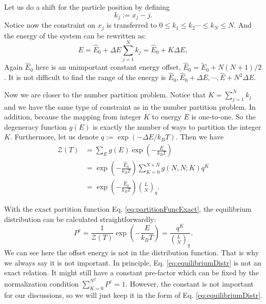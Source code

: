 Let us do a shift for the particle position by defining
\begin{equation}
    k_j := x_j - j.
\end{equation}
Notice now the constraint on $x_j$ is transferred to $0 \leqslant k_1 \leqslant k_2 \cdots \leqslant k_N \leqslant N$. And the energy of the system can be rewritten as:
\begin{equation}
    E = \hat{E}_0 + \Delta E \sum_{j=1}^N k_j = \hat{E}_0 + K \Delta E,
\end{equation}
Again $\hat{E}_0$ here is an unimportant constant energy offset, $\hat{E}_0 = \tilde{E}_0+N(N+1)/2$. 
It is not difficult to find the range of the energy is $\hat{E}_0, \hat{E}_0 + \Delta E, \cdots, \hat{E}+N^2\Delta E$. 

Now we are closer to the number partition problem. Notice that $K=\sum_{j=1}^{N}k_j$ and we have the same type of constraint as in the number partition problem. In addition, because the mapping from integer $K$ to energy $E$ is one-to-one. So the degeneracy function $g(E)$ is exactly the number of ways to partition the integer $K$. Furthermore, let us denote $q:=\exp\left(-\Delta E/ k_B T\right)$. Then we have
\begin{equation}
    \begin{aligned}
    \label{eq:partitionFuncExact}
    \mathcal{Z}\left(T\right) & = \sum_{E}g(E)\exp \left(-\frac{E}{k_B T}\right) \\ 
    & = \exp\left(-\frac{\hat{E}_0}{k_B T}\right)\sum_{K=0}^{N \times N} g(N, N; K) q^K \\
    & = \exp\left(-\frac{\hat{E}_0}{k_B T}\right)\binom{L}{N}_q.
    \end{aligned}
\end{equation}


With the exact partition function Eq. \eqref{eq:partitionFuncExact}, the equilibrium distribution can be calculated straightforwardly:
\begin{equation}
    \label{eq:equilibriumDistr}
    P^{e} = \frac{1}{\mathcal{Z}\left(T\right)}\exp\left(-\frac{E}{k_B T}\right) = \frac{q^K}{\binom{L}{N}_q}.
\end{equation}
We can see here the offset energy is not in the distribution function. That is why we always say it is not important. In principle, Eq. \eqref{eq:equilibriumDistr} is not an exact relation. It might still have a constant pre-factor which can be fixed by the normalization condition $\sum_{K=0}^{N^2} P^e = 1$. However, the constant is not important for our discussions, so we will just keep it in the form of Eq. \eqref{eq:equilibriumDistr}.

